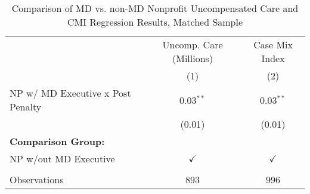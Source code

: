\begin{table}[htbp]
   \caption{\label{tab:MD_noMD_uncomp_CMI_matchsample} Comparison of MD vs. non-MD Nonprofit Uncompensated Care and CMI Regression Results, Matched Sample}
   \bigskip
   \centering
   \begin{tabular}{lcc}
      \toprule
                                        & Uncomp. Care (Millions) & Case Mix Index\\  
                                        & (1)                     & (2)\\  
      \midrule 
      NP w/ MD Executive x Post Penalty & 0.03$^{**}$             & 0.03$^{**}$\\   
                                        & (0.01)                  & (0.01)\\   
      \textbf{Comparison Group:}        &                         & \\  
      NP w/out MD Executive             & $\checkmark$            & $\checkmark$\\   
       \\
      Observations                      & 893                     & 996\\  
      \bottomrule
   \end{tabular}
\end{table}
